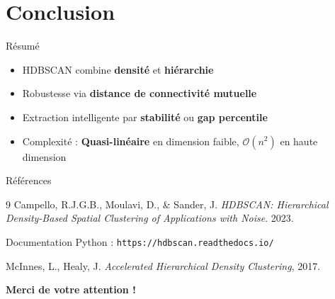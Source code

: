 \documentclass[aspectratio=139,8pt]{beamer}
\begin{document}
\section{Conclusion}

\begin{frame}{Résumé}
\begin{itemize}
\item HDBSCAN combine \textbf{densité} et \textbf{hiérarchie}
\item Robustesse via \textbf{distance de connectivité mutuelle}
\item Extraction intelligente par \textbf{stabilité} ou \textbf{gap percentile}
\item Complexité : \textbf{Quasi-linéaire} en dimension faible, $\mathcal{O}(n^2)$ en haute dimension
\end{itemize}

\begin{figure}
\centering
{}
\end{figure}
\end{frame}

\begin{frame}{Références}
\begin{thebibliography}{9}
 Campello, R.J.G.B., Moulavi, D., \& Sander, J. \textit{HDBSCAN: Hierarchical Density-Based Spatial Clustering of Applications with Noise}. 2023.

 Documentation Python : \texttt{https://hdbscan.readthedocs.io/}

 McInnes, L., Healy, J. \textit{Accelerated Hierarchical Density Clustering}, 2017.
\end{thebibliography}

\vspace{1cm}
\centering
\Large\textbf{Merci de votre attention !}
\end{frame}
\end{document}
